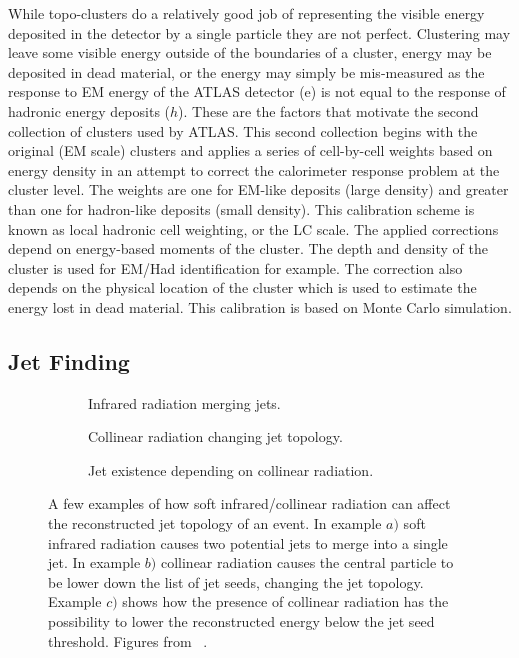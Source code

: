  
While topo-clusters do a relatively good job of representing the visible energy deposited in the detector by a single particle they are not perfect.  
Clustering may leave some visible energy outside of the boundaries of a cluster, energy may be deposited in dead material, or the energy may simply be mis-measured as the response to EM energy of the ATLAS detector (e) is not equal to the response of hadronic energy deposits ($h$).  
These are the factors that motivate the second collection of clusters used by ATLAS.  
This second collection begins with the original (EM scale) clusters and applies a series of cell-by-cell weights based on energy density in an attempt to correct the calorimeter response problem at the cluster level.  
The weights are one for EM-like deposits (large density) and greater than one for hadron-like deposits (small density).  
This calibration scheme is known as local hadronic cell weighting, or the LC scale.  
The applied corrections depend on energy-based moments of the cluster.  
The depth and density of the cluster is used for EM/Had identification for example.  
The correction also depends on the physical location of the cluster which is used to estimate the energy lost in dead material.  
This calibration is based on Monte Carlo simulation.   

\subsection{Jet Finding}
\label{Sec:JetFinding}
\begin{figure}[!ht]
 \centering
 \begin{subfigure}{.5\textwidth}
  \centering
  \caption{Infrared radiation merging jets.}
 \end{subfigure}%
 \begin{subfigure}{.5\textwidth}
  \centering
  \caption{Collinear radiation changing jet topology.}
 \end{subfigure}
 \begin{subfigure}{.5\textwidth}
  \centering
  \caption{Jet existence depending on collinear radiation.}
 \end{subfigure}
 \caption[Effect of radiation on jet building.]
  {A few examples of how soft infrared/collinear radiation can affect the reconstructed jet topology of an event.  In example $a)$ soft infrared radiation causes two potential jets to merge into a single jet.  In example $b)$ collinear radiation causes the central particle to be lower down the list of jet seeds, changing the jet topology.  Example $c)$ shows how the presence of collinear radiation has the possibility to lower the reconstructed energy below the jet seed threshold.  Figures from ~\cite{Blazey:2000qt}. }
 \label{Fig:IRCoSafety}
\end{figure}


